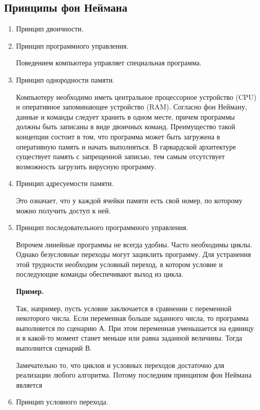 \documentclass[a4paper, fleqn]{article}
\newenvironment{example}[1][]{\medskip \noindent \textbf{Пример. #1}\par \nopagebreak}{\medskip \par} %
\begin{document}
	\subsection*{Принципы фон Неймана}
		\begin {enumerate}
			\item Принцип двоичности. 
			
			\item Принцип программного управления.
			
			Поведением компьютера управляет специальная программа.
						
			\item Принцип однородности памяти.
			
			Компьютеру необходимо иметь центральное процессорное устройство (CPU) и оперативное запоминающее устройство (RAM). Согласно фон Нейману, данные и команды следует хранить в одном месте, причем программы должны быть записаны  в виде двоичных команд. Преимущество такой концепции состоит в том, что программа может быть загружена в оперативную память и начать выполняться.
			В гарвардской архитектуре существует память с запрещенной записью, тем самым отсутствует возможность загрузить вирусную программу.
			
			\item Принцип адресуемости памяти.
			
			Это означает, что у каждой ячейки памяти есть свой номер, по которому можно получить доступ к ней.
			
			\item Принцип последовательного программного управления. 
			
			Впрочем линейные программы не всегда удобны. Часто необходимы циклы.  Однако безусловные переходы могут зациклить программу. Для устранения этой трудности необходим условный переход, в котором условие и последующие команды обеспечивают выход из цикла.
			
			\begin{example}
				Так, например, пусть условие заключается в сравнении с переменной  некоторого числа.  Если переменная больше заданного числа,  то программа выполняется по сценарию А. При этом переменная уменьшается на единицу и в какой-то момент станет меньше или равна заданной величины. Тогда выполнится сценарий В.
			\end{example}
			
			Замечательно то, что циклов и условных переходов достаточно для  реализации любого алгоритма. Потому последним принципом фон Неймана является 
			\item Принцип условного перехода.
		\end {enumerate}
		
\end{document}
